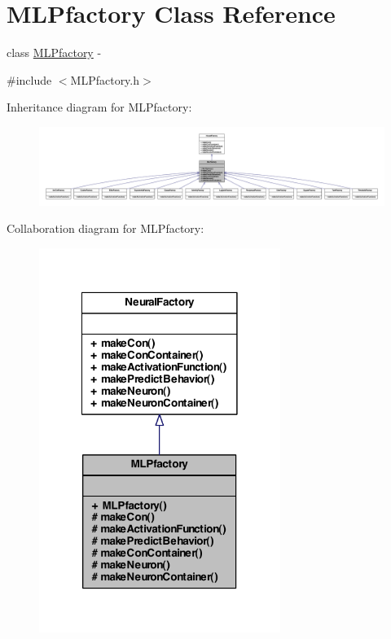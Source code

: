 \hypertarget{class_m_l_pfactory}{
\section{MLPfactory Class Reference}
\label{class_m_l_pfactory}
}


class \hyperlink{class_m_l_pfactory}{MLPfactory} -\/  




{\ttfamily \#include $<$MLPfactory.h$>$}



Inheritance diagram for MLPfactory:
\nopagebreak
\begin{figure}[H]
\begin{center}
\leavevmode
\includegraphics[width=400pt]{class_m_l_pfactory__inherit__graph}
\end{center}
\end{figure}


Collaboration diagram for MLPfactory:
\nopagebreak
\begin{figure}[H]
\begin{center}
\leavevmode
\includegraphics[width=222pt]{class_m_l_pfactory__coll__graph}
\end{center}
\end{figure}
